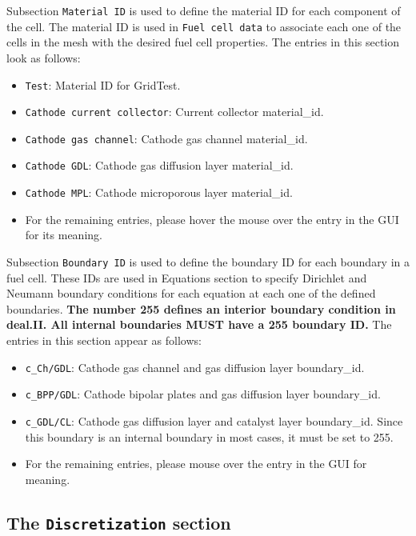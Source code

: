 Subsection \texttt{Material ID} is used to define the material ID for each component of the cell. The material ID is used in \texttt{Fuel cell data} to associate each one of the cells in the mesh with the desired fuel cell properties. The entries in this section look as follows:
\begin{itemize}
  \item \texttt{Test}: Material ID for GridTest.
  \item \texttt{Cathode current collector}: Current collector material\_id.
  \item \texttt{Cathode gas channel}: Cathode gas channel material\_id.
  \item \texttt{Cathode GDL}: Cathode gas diffusion layer material\_id.
  \item \texttt{Cathode MPL}: Cathode microporous layer material\_id.
  \item For the remaining entries, please hover the mouse over the entry in the GUI for its meaning.
\end{itemize}

Subsection \texttt{Boundary ID} is used to define the boundary ID for each boundary in a fuel cell. These IDs are used in Equations section to specify Dirichlet and Neumann boundary conditions for each equation at each one of the defined boundaries. \textbf{The number 255 defines an interior boundary condition in deal.II. All internal boundaries MUST have a 255 boundary ID.} The entries in this section appear as follows:
\begin{itemize}             
  \item \texttt{c\_Ch/GDL}: Cathode gas channel and gas diffusion layer boundary\_id. 
  \item \texttt{c\_BPP/GDL}: Cathode bipolar plates and gas diffusion layer boundary\_id.
  \item \texttt{c\_GDL/CL}: Cathode gas diffusion layer and catalyst layer boundary\_id. Since this boundary is an internal boundary in most cases, it must be set to 255.
  \item For the remaining entries, please mouse over the entry in the GUI for meaning.
\end{itemize}

\subsection{The \texttt{Discretization} section}

